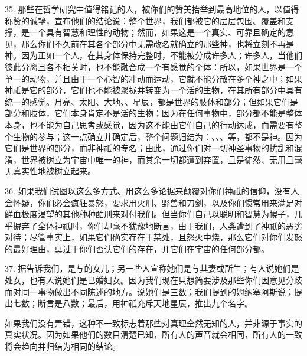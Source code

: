 35. 那些在哲学研究中值得铭记的人，被你们的赞美抬举到最高地位的人，以值得称赞的诚挚，宣布他们的结论说：整个世界，我们都被它的层层包围、覆盖和支撑，是一个具有智慧和理性的动物；然而，如果这是一个真实、可靠且确定的意见，那么你们不久前在其各个部分中无需改名就确立的那些神，也将立刻不再是神。因为正如一个人，在其身体保持完整时，不能被分成许多人；许多人，当他们彼此分离且各不相关时，也不能融合成一个有感觉的个体：所以，如果世界是一个单一的动物，并且由于一个心智的冲动而运动，它就不能分散在多个神之中；如果神祇是它的部分，它们也不能被聚拢并转变为一个活的生物，在其所有部分中具有统一的感觉。月亮、太阳、大地、、星辰，都是世界的肢体和部分；但如果它们是部分和肢体，它们本身肯定不是活的生物；因为在任何事物中，部分都不能是整体本身，也不能为自己思考或感觉，因为这不能由它们自己的行动达成，而需要有整个生物的参与；这一点确立并确定后，整个问题归结为：、、、等，都不是神。因为它们是世界的部分，而非神祇的专名；由此，通过你们对一切神圣事物的扰乱和混淆，世界被树立为宇宙中唯一的神，而其余一切都遭到弃置，且是徒然、无用且毫无真实性地被树立起来。\par

36. 如果我们试图以这么多方式、用这么多论据来颠覆对你们神祇的信仰，没有人会怀疑，你们必会疯狂暴怒，要求用火刑、野兽和刀剑，以及你们惯常用来满足对鲜血极度渴望的其他种种酷刑来对付我们。但当你们自己以聪明和智慧为幌子，几乎摒弃了全体神祇时，你们却毫不犹豫地断言，由于我们，人类遭到了神祇的恶劣对待；尽管事实上，如果它们确实存在于某处，且怒火中烧，那么它们对你们发怒的最好理由，莫过于你们否认它们的存在，并它们在宇宙的任何部分都。\par

37. 据告诉我们，是与的女儿；另一些人宣称她们是与其妻或所生；有人说她们是处女，也有人说她们是已婚妇女。因为我们现在只想简要涉及那些你们因意见分歧而对同一事物做出不同陈述的地方。说她们是三数；我们提到的姆纳塞阿斯说；提出七数；断言是八数；最后，用神祇充斥天地星辰，推出九个名字。\par

如果我们没有弄错，这种不一致标志着那些对真理全然无知的人，并非源于事实的真实状况。因为如果他们的数目清楚已知，所有人的声音就会相同，所有人的一致将会趋向并归结为相同的结论。\par

